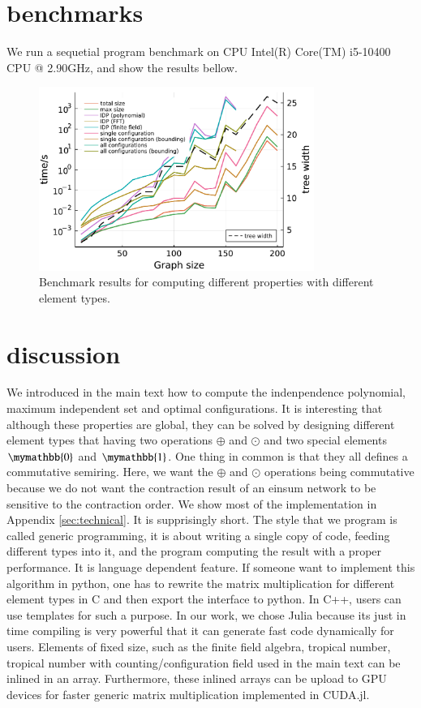 \documentclass{article}
\newcommand{\<}{\langle}
\renewcommand{\>}{\rangle}
\theoremstyle{definition}\newtheorem{definition}{\textit{Definition}}
\begin{document}
\section{benchmarks}
We run a sequetial program benchmark on CPU Intel(R) Core(TM) i5-10400 CPU @ 2.90GHz, and show the results bellow.
\begin{figure}
    \centering
    \includegraphics[width=0.8\textwidth, trim={0cm 0cm 0cm 0cm}, clip]{benchmark.pdf}
    \caption{Benchmark results for computing different properties with different element types.
    }\label{fig:benchmark}
\end{figure}

\section{discussion}
We introduced in the main text how to compute the indenpendence polynomial, maximum independent set and optimal configurations.
It is interesting that although these properties are global,
they can be solved by designing different element types that having two operations $\oplus$ and $\odot$ and two special elements $\mymathbb{0}$ and $\mymathbb{1}$.
One thing in common is that they all defines a commutative semiring.
Here, we want the $\oplus$ and $\odot$ operations being commutative because we do not want the contraction result of an einsum network to be sensitive to the contraction order.
We show most of the implementation in Appendix \ref{sec:technical}. It is supprisingly short.
The style that we program is called generic programming,
it is about writing a single copy of code, feeding different types into it, and the program computing the result with a proper performance.
It is language dependent feature. If someone want to implement this algorithm in python,
one has to rewrite the matrix multiplication for different element types in C and then export the interface to python.
In C++, users can use templates for such a purpose.
In our work, we chose Julia because its just in time compiling is very powerful that it can generate fast code dynamically for users.
Elements of fixed size, such as the finite field algebra, tropical number, tropical number with counting/configuration field used in the main text can be inlined in an array.
Furthermore, these inlined arrays can be upload to GPU devices for faster generic matrix multiplication implemented in CUDA.jl.
\end{document}
